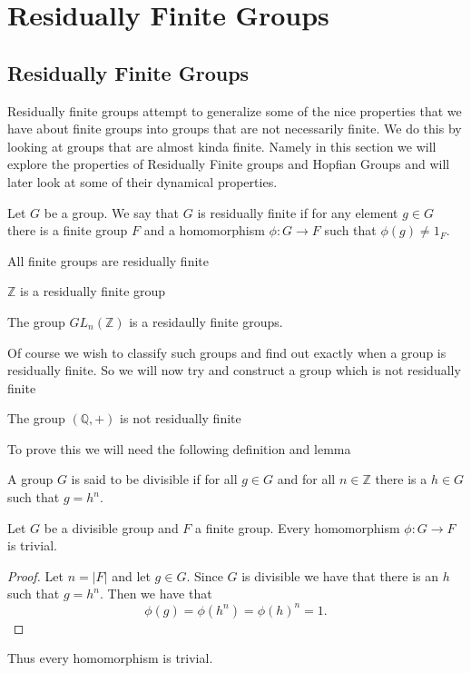 \section{Residually Finite Groups}%
\label{sec:Residually Finite Groups}

\subsection{Residually Finite Groups}
Residually finite groups attempt to generalize some of the nice properties that we 
have about finite groups into groups that are not necessarily finite. We do this by
looking at groups that are almost kinda finite. Namely in this section we will 
explore the properties of Residually Finite groups and Hopfian Groups and will 
later look at some of their dynamical properties.


\begin{defn}
  Let $G$ be a group. We say that $G$ is residually finite if for any element
  $g \in G$ there is a finite group $F$ and a homomorphism $\phi: G \to F$ such
  that $\phi(g) \neq 1_F$.
\end{defn}

\begin{ex}
  All finite groups are residually finite
\end{ex}
\begin{ex}
  $\mathbb{Z}$ is a residually finite group
\end{ex}
\begin{ex}
  The group $GL_{n}(\mathbb{Z})$ is a residaully finite groups.
\end{ex}

Of course we wish to classify such groups and find out exactly when a group is 
residually finite. So we will now try and construct a group which is not residually 
finite

\begin{propn}
  The group $(\mathbb{Q}, +)$ is not residually finite
\end{propn}

To prove this we will need the following definition and lemma

\begin{defn}
  A group $G$ is said to be divisible if for all $g \in G$ and for all $n \in
  \mathbb{Z}$ there is a $h \in G$ such that $g = h^{n}$.
\end{defn}
\begin{lemma}
  Let $G$ be a divisible group and $F$ a finite group. Every homomorphism
  $\phi: G \to F$ is trivial.
\end{lemma}
\begin{proof}
 Let $n = |F|$ and let $g \in G$. Since $G$ is divisible we have that there is
 an $h$ such that $g = h^{n}$. Then we have that
 \[
 \phi(g) = \phi(h^{n}) = \phi(h)^{n} = 1
 .\] 
\end{proof}
Thus every homomorphism is trivial.

